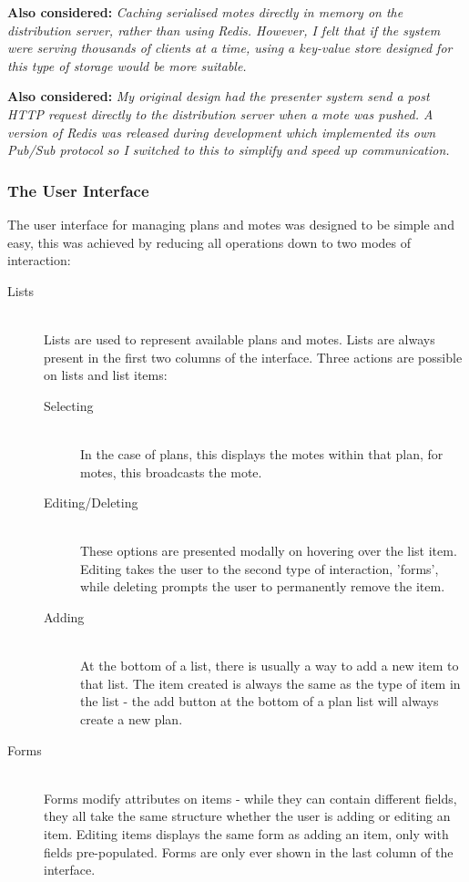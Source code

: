 \documentclass[a4papert,11pt,notitlepage]{ltxdoc}
\begin{document}
\textbf{Also considered:} \emph{Caching serialised motes directly in memory on the distribution server, rather than using Redis. However, I felt that if the system were serving thousands of clients at a time, using a key-value store designed for this type of storage would be more suitable.}

\textbf{Also considered:} \emph{My original design had the presenter system send a post HTTP request directly to the distribution server when a mote was pushed. A version of Redis was released during development which implemented its own Pub/Sub protocol so I switched to this to simplify and speed up communication.}

\subsubsection{The User Interface}
The user interface for managing plans and motes was designed to be simple and easy, this was achieved by reducing all operations down to two modes of interaction:
\begin{description}
\item[Lists] \hfill \\
Lists are used to represent available plans and motes. Lists are always present in the first two columns of the interface. Three actions are possible on lists and list items:
\begin{description}
\item[Selecting] \hfill \\
In the case of plans, this displays the motes within that plan, for motes, this broadcasts the mote.
\item[Editing/Deleting] \hfill \\
These options are presented modally on hovering over the list item. Editing takes the user to the second type of interaction, 'forms', while deleting prompts the user to permanently remove the item.
\item[Adding] \hfill \\
At the bottom of a list, there is usually a way to add a new item to that list. The item created is always the same as the type of item in the list - the add button at the bottom of a plan list will always create a new plan.
\end{description}
\item[Forms] \hfill \\
Forms modify attributes on items - while they can contain different fields, they all take the same structure whether the user is adding or editing an item. Editing items displays the same form as adding an item, only with fields pre-populated. Forms are only ever shown in the last column of the interface.
\end{description}
\end{document}
